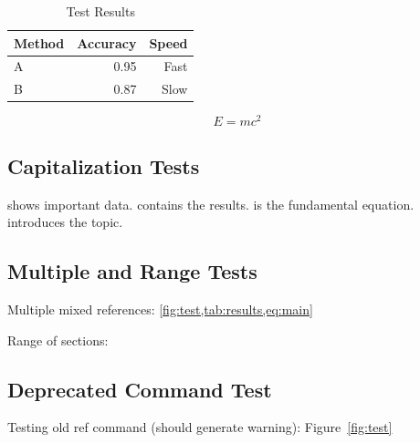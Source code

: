 \documentclass[11pt,letterpaper]{article}
\begin{document}
\begin{table}[ht]
  \caption{Test Results}
  \label{tab:results}
  \centering
  \begin{tabular}{lrr}
    \toprule
    Method & Accuracy & Speed \\
    \midrule
    A & 0.95 & Fast \\
    B & 0.87 & Slow \\
    \bottomrule
  \end{tabular}
\end{table}

\begin{equation}
  E = mc^2
  \label{eq:main}
\end{equation}

\subsection{Capitalization Tests}
\label{subsec:caps}

 shows important data.  contains the results. 
 is the fundamental equation.  introduces the topic.

\subsection{Multiple and Range Tests}

Multiple mixed references: \cref{fig:test,tab:results,eq:main}

Range of sections: 

\subsection{Deprecated Command Test}

Testing old ref command (should generate warning): Figure~\ref{fig:test}
\end{document}
